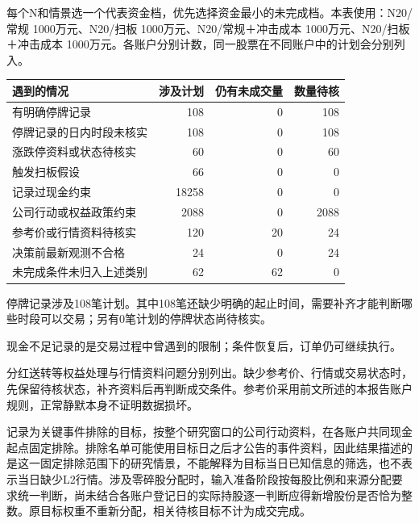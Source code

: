 \documentclass[UTF8,10pt,a4paper,fontset=fandol]{ctexart}
\begin{document}
每个N和情景选一个代表资金档，优先选择资金最小的未完成档。本表使用：N20/常规 1000万元、N20/扫板 1000万元、N20/常规＋冲击成本 1000万元、N20/扫板＋冲击成本 1000万元。各账户分别计数，同一股票在不同账户中的计划会分别列入。\begin{table}[H]\centering\small\begin{tabular}{lrrr}\toprule 遇到的情况 & 涉及计划 & 仍有未成交量 & 数量待核\\\midrule 有明确停牌记录 & 108 & 0 & 108 \\
停牌记录的日内时段未核实 & 108 & 0 & 108 \\
涨跌停资料或状态待核实 & 60 & 0 & 60 \\
触发扫板假设 & 66 & 0 & 0 \\
记录过现金约束 & 18258 & 0 & 0 \\
公司行动或权益政策约束 & 2088 & 0 & 2088 \\
参考价或行情资料待核实 & 120 & 20 & 24 \\
决策前最新观测不合格 & 24 & 0 & 24 \\
未完成条件未归入上述类别 & 62 & 62 & 0 \\\bottomrule\end{tabular}\end{table}

停牌记录涉及108笔计划。其中108笔还缺少明确的起止时间，需要补齐才能判断哪些时段可以交易；另有0笔计划的停牌状态尚待核实。

现金不足记录的是交易过程中曾遇到的限制；条件恢复后，订单仍可继续执行。

分红送转等权益处理与行情资料问题分别列出。缺少参考价、行情或交易状态时，先保留待核状态，补齐资料后再判断成交条件。参考价采用前文所述的本报告账户规则，正常静默本身不证明数据损坏。

记录为关键事件排除的目标，按整个研究窗口的公司行动资料，在各账户共同现金起点固定排除。排除名单可能使用目标日之后才公告的事件资料，因此结果描述的是这一固定排除范围下的研究情景，不能解释为目标当日已知信息的筛选，也不表示当日缺少L2行情。涉及零碎股分配时，输入准备阶段按每股比例和来源分配要求统一判断，尚未结合各账户登记日的实际持股逐一判断应得新增股份是否恰为整数。原目标权重不重新分配，相关待核目标不计为成交完成。
\end{document}
